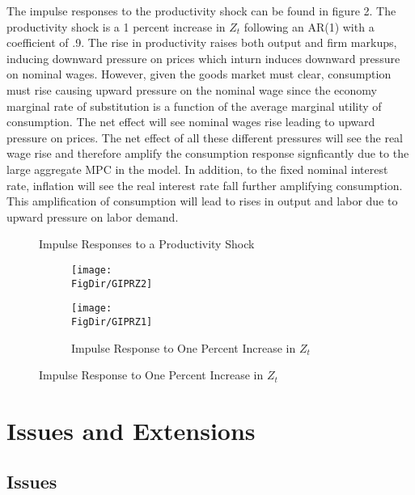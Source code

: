 \documentclass[titlepage]{\econtex}\providecommand{\texname}{FBS-NK}
\providecommand{\FigDir}{Figures}
\begin{document}
The impulse responses to the productivity shock can be found in figure 2. The productivity shock is a 1 percent increase in $Z_{t}$ following an AR(1) with a coefficient of .9. The rise in productivity raises both output and firm markups, inducing downward pressure on prices which inturn induces downward pressure on nominal wages. However, given the goods market must clear, consumption must rise causing upward pressure on the nominal wage since the economy marginal rate of substitution is a function of the average marginal utility of consumption. The net effect will see nominal wages rise leading to upward pressure on prices. The net effect of all these different pressures will see the real wage rise and therefore amplify the consumption response signficantly due to the large aggregate MPC in the model. In addition, to the fixed nominal interest rate, inflation will see the real interest rate fall further amplifying consumption. This amplification of consumption will lead to rises in output and labor due to upward pressure on labor demand.

\begin{figure}{Impulse Responses to a Productivity Shock}
  \begin{subfigure}{}
    \centering\texttt{[image: \\FigDir/GIPRZ2]}
  \end{subfigure}
  \begin{subfigure}{}
    \centering\texttt{[image: \\FigDir/GIPRZ1]}
    \caption{ Impulse Response to One Percent Increase in $Z_{t}$}
  \end{subfigure}
\end{figure}



\hypertarget{Issues and Extensions}{}
\section{Issues and Extensions}

\hypertarget{Issues }{}
\subsection{Issues }
\end{document}
